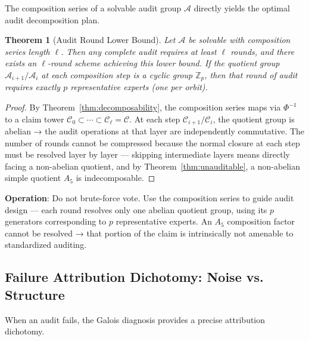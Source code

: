 \documentclass[10pt,a4paper]{article}
\newtheorem{theorem}{Theorem}[section]
\theoremstyle{remark}
\begin{document}
The composition series of a solvable audit group $\mathcal{A}$ directly yields the optimal audit decomposition plan.

\begin{theorem}[Audit Round Lower Bound]
Let $\mathcal{A}$ be solvable with composition series length $\ell$. Then any complete audit requires at least $\ell$ rounds, and there exists an $\ell$-round scheme achieving this lower bound. If the quotient group $\mathcal{A}_{i+1}/\mathcal{A}_i$ at each composition step is a cyclic group $\mathbb{Z}_p$, then that round of audit requires exactly $p$ representative experts (one per orbit).
\end{theorem}

\begin{proof}
By Theorem~\ref{thm:decomposability}, the composition series maps via $\Phi^{-1}$ to a claim tower $\mathcal{C}_0 \subset \cdots \subset \mathcal{C}_\ell = \mathcal{C}$. At each step $\mathcal{C}_{i+1}/\mathcal{C}_i$, the quotient group is abelian → the audit operations at that layer are independently commutative. The number of rounds cannot be compressed because the normal closure at each step must be resolved layer by layer --- skipping intermediate layers means directly facing a non-abelian quotient, and by Theorem~\ref{thm:unauditable}, a non-abelian simple quotient $A_5$ is indecomposable.
\end{proof}

\textbf{Operation}: Do not brute-force vote. Use the composition series to guide audit design --- each round resolves only one abelian quotient group, using its $p$ generators corresponding to $p$ representative experts. An $A_5$ composition factor cannot be resolved → that portion of the claim is intrinsically not amenable to standardized auditing.

\subsection{Failure Attribution Dichotomy: Noise vs. Structure}

When an audit fails, the Galois diagnosis provides a precise attribution dichotomy.
\end{document}
